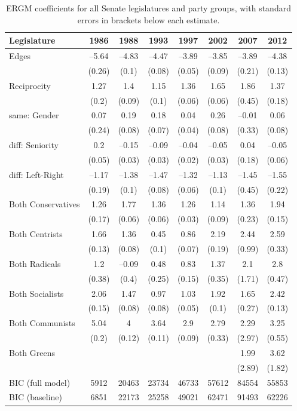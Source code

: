 \begin{table}[ht]
\centering
\begin{tabular}{lccccccc}
  \hline
Legislature & 1986 & 1988 & 1993 & 1997 & 2002 & 2007 & 2012 \\ 
  \hline
Edges & –5.64 & –4.83 & –4.47 & –3.89 & –3.85 & –3.89 & –4.38 \\ 
   & (0.26) & (0.1) & (0.08) & (0.05) & (0.09) & (0.21) & (0.13) \\ 
  Reciprocity & 1.27 & 1.4 & 1.15 & 1.36 & 1.65 & 1.86 & 1.37 \\ 
   & (0.2) & (0.09) & (0.1) & (0.06) & (0.06) & (0.45) & (0.18) \\ 
  same: Gender & 0.07 & 0.19 & 0.18 & 0.04 & 0.26 & –0.01 & 0.06 \\ 
   & (0.24) & (0.08) & (0.07) & (0.04) & (0.08) & (0.33) & (0.08) \\ 
  diff: Seniority & 0.2 & –0.15 & –0.09 & –0.04 & –0.05 & 0.04 & –0.05 \\ 
   & (0.05) & (0.03) & (0.03) & (0.02) & (0.03) & (0.18) & (0.06) \\ 
  diff: Left-Right & –1.17 & –1.38 & –1.47 & –1.32 & –1.13 & –1.45 & –1.55 \\ 
   & (0.19) & (0.1) & (0.08) & (0.06) & (0.1) & (0.45) & (0.22) \\ 
  Both Conservatives & 1.26 & 1.77 & 1.36 & 1.26 & 1.14 & 1.36 & 1.94 \\ 
   & (0.17) & (0.06) & (0.06) & (0.03) & (0.09) & (0.23) & (0.15) \\ 
  Both Centrists & 1.66 & 1.36 & 0.45 & 0.86 & 2.19 & 2.44 & 2.59 \\ 
   & (0.13) & (0.08) & (0.1) & (0.07) & (0.19) & (0.99) & (0.33) \\ 
  Both Radicals & 1.2 & –0.09 & 0.48 & 0.83 & 1.37 & 2.1 & 2.8 \\ 
   & (0.38) & (0.4) & (0.25) & (0.15) & (0.35) & (1.71) & (0.47) \\ 
  Both Socialists & 2.06 & 1.47 & 0.97 & 1.03 & 1.92 & 1.65 & 2.42 \\ 
   & (0.15) & (0.08) & (0.08) & (0.05) & (0.1) & (0.27) & (0.13) \\ 
  Both Communists & 5.04 & 4 & 3.64 & 2.9 & 2.79 & 2.29 & 3.25 \\ 
   & (0.2) & (0.12) & (0.11) & (0.09) & (0.33) & (2.97) & (0.55) \\ 
  Both Greens &  &  &  &  &  & 1.99 & 3.62 \\ 
   &  &  &  &  &  & (2.89) & (1.82) \\ 
   \hline
BIC (full model) & 5912 & 20463 & 23734 & 46733 & 57612 & 84554 & 55853 \\ 
  BIC (baseline) & 6851 & 22173 & 25258 & 49021 & 62471 & 91493 & 62226 \\ 
   \hline
\end{tabular}
\caption{ERGM coefficients for all Senate legislatures and party groups, with standard errors in brackets below each estimate.} 
\label{tbl:ergm_se}
\end{table}
